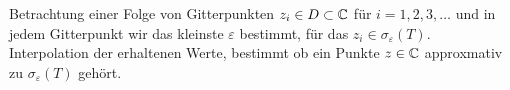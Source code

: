 Betrachtung einer Folge von Gitterpunkten $z_i\in D\subset \mathbb C  $ für $i=1,2,3,\dots$ und in jedem Gitterpunkt
wir das kleinste $\varepsilon$ bestimmt, für das $z_i\in\sigma_\varepsilon(T)$. \\
Interpolation der erhaltenen Werte, bestimmt ob ein Punkte $z\in\mathbb C  $ approxmativ zu $\sigma_\varepsilon(T)$ gehört.
